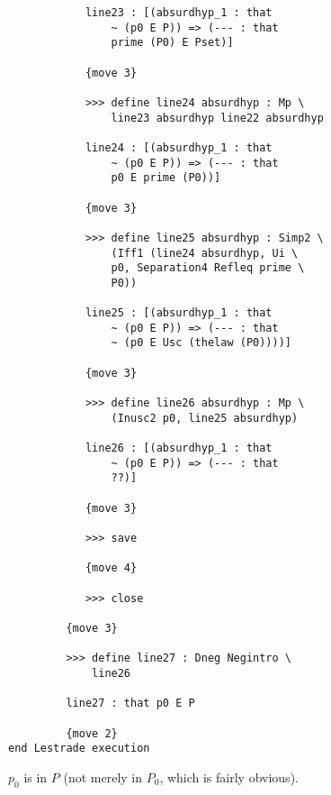 \documentclass[12pt]{article}
\begin{document}
\begin{verbatim}
            line23 : [(absurdhyp_1 : that 
                ~ (p0 E P)) => (--- : that 
                prime (P0) E Pset)]

            {move 3}

            >>> define line24 absurdhyp : Mp \
                line23 absurdhyp line22 absurdhyp

            line24 : [(absurdhyp_1 : that 
                ~ (p0 E P)) => (--- : that 
                p0 E prime (P0))]

            {move 3}

            >>> define line25 absurdhyp : Simp2 \
                (Iff1 (line24 absurdhyp, Ui \
                p0, Separation4 Refleq prime \
                P0))

            line25 : [(absurdhyp_1 : that 
                ~ (p0 E P)) => (--- : that 
                ~ (p0 E Usc (thelaw (P0))))]

            {move 3}

            >>> define line26 absurdhyp : Mp \
                (Inusc2 p0, line25 absurdhyp)

            line26 : [(absurdhyp_1 : that 
                ~ (p0 E P)) => (--- : that 
                ??)]

            {move 3}

            >>> save

            {move 4}

            >>> close

         {move 3}

         >>> define line27 : Dneg Negintro \
             line26

         line27 : that p0 E P

         {move 2}
end Lestrade execution
\end{verbatim}

$p_0$ is in $P$ (not merely in $P_0$, which is fairly obvious).
\end{document}
